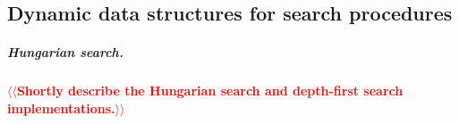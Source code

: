 \documentclass[a4paper,UKenglish]{socg-lipics-v2018}
\makeatletter
\def\note#1{\textcolor{red}{{#1}}}
\def\eps{\varepsilon}
\DeclareMathOperator*{\argmin}{arg\,min}
\def\fsupply{\phi}
\theoremstyle{plain}
\numberwithin{figure}{section}
\renewcommand{\paragraph}{\subparagraph}
\def\n@te#1{\textsf{\boldmath \textbf{$\langle\!\langle$#1$\rangle\!\rangle$}}\leavevmode}
\def\note#1{\textcolor{red}{\n@te{#1}}}
\makeatother
\begin{document}
\subsection{Dynamic data structures for search procedures}

\paragraph{Hungarian search.}



\note{Shortly describe the Hungarian search and depth-first search implementations.}
\end{document}
